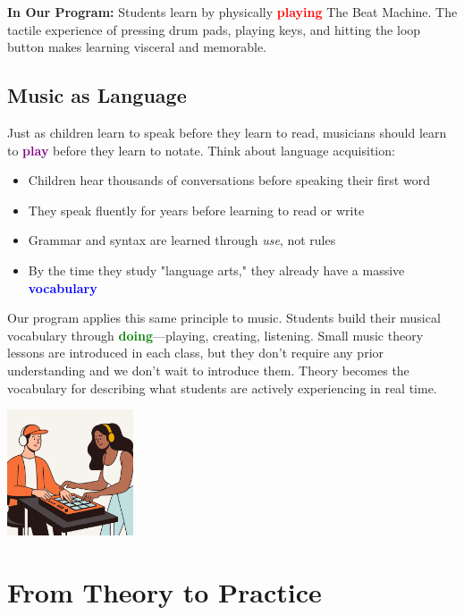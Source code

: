 \documentclass[11pt,letterpaper]{article}
\newcommand{\purple}[1]{\textcolor{purple}{\textbf{#1}}}
\newcommand{\bluepurple}[1]{\textcolor{blue}{\textbf{#1}}}
\newcommand{\greentext}[1]{\textcolor{green}{\textbf{#1}}}
\newcommand{\redtext}[1]{\textcolor{red}{\textbf{#1}}}
\begin{document}
\textbf{In Our Program:} Students learn by physically \redtext{playing} The Beat Machine. The tactile experience of pressing drum pads, playing keys, and hitting the loop button makes learning visceral and memorable.

\subsection*{Music as Language}

Just as children learn to speak before they learn to read, musicians should learn to \purple{play} before they learn to notate. Think about language acquisition:

\begin{itemize}[leftmargin=*]
\item Children hear thousands of conversations before speaking their first word
\item They speak fluently for years before learning to read or write
\item Grammar and syntax are learned through \textit{use}, not rules
\item By the time they study "language arts," they already have a massive \bluepurple{vocabulary}
\end{itemize}

Our program applies this same principle to music. Students build their musical vocabulary through \greentext{doing}—playing, creating, listening. Small music theory lessons are introduced in each class, but they don't require any prior understanding and we don't wait to introduce them. Theory becomes the vocabulary for describing what students are actively experiencing in real time.

\begin{center}
\includegraphics[width=0.28\textwidth]{../../assets/images/illustrations/Jamming.png}
\end{center}

\newpage

\section*{From Theory to Practice}
\end{document}
